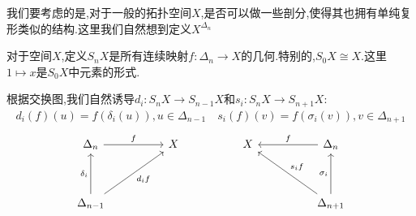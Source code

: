 我们要考虑的是,对于一般的拓扑空间$X$,是否可以做一些剖分,使得其也拥有单纯复形类似的结构.这里我们自然想到定义$X^{\Delta_n}$
\begin{definition}
    对于空间$X$,定义$S_nX$是所有连续映射$f:\Delta_n \to X$的几何.特别的,$S_0X \cong X$.这里$1 \mapsto x$是$S_0X$中元素的形式.
\end{definition}
根据交换图,我们自然诱导$d_i:S_nX \to S_{n-1}X$和$s_i:S_nX \to S_{n+1}X$:
\begin{align*}
    d_i(f)(u)=f(\delta_i(u)),u \in \Delta_{n-1}   \quad s_i(f)(v)=f(\sigma_i(v)),v \in \Delta_{n+1}
\end{align*}
\[\begin{tikzcd}
	{\Delta_n} && X && X && {\Delta_n} \\
	\\
	{\Delta_{n-1}} &&&&&& {\Delta_{n+1}}
	\arrow["{\delta_i}", from=3-1, to=1-1]
	\arrow["f", from=1-1, to=1-3]
	\arrow["{d_if}"', from=3-1, to=1-3]
	\arrow["f"', from=1-7, to=1-5]
	\arrow["{s_if}"', from=3-7, to=1-5]
	\arrow["{\sigma_i}", from=3-7, to=1-7]
    \end{tikzcd}
\]

